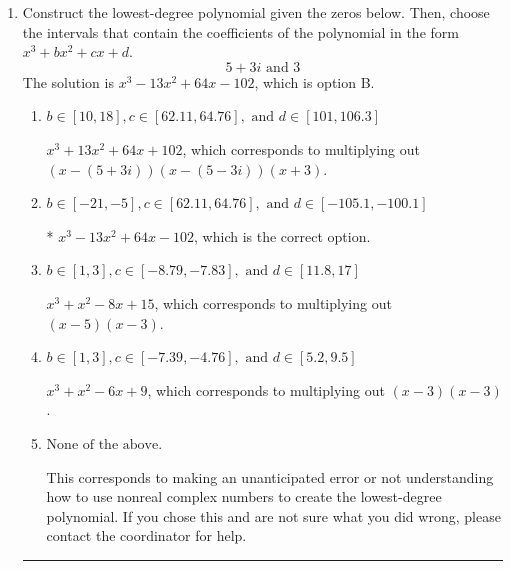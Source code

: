\documentclass{extbook}[14pt]
\newcommand{\litem}[1]{\item #1

\rule{\textwidth}{0.4pt}}
\begin{document}
\begin{enumerate}\litem{
Construct the lowest-degree polynomial given the zeros below. Then, choose the intervals that contain the coefficients of the polynomial in the form $x^3+bx^2+cx+d$.
\[ 5 + 3 i \text{ and } 3 \]The solution is \( x^{3} -13 x^{2} +64 x -102 \), which is option B.\begin{enumerate}[label=\Alph*.]
\item \( b \in [10, 18], c \in [62.11, 64.76], \text{ and } d \in [101, 106.3] \)

$x^{3} +13 x^{2} +64 x + 102$, which corresponds to multiplying out $(x-(5 + 3 i))(x-(5 - 3 i))(x + 3)$.
\item \( b \in [-21, -5], c \in [62.11, 64.76], \text{ and } d \in [-105.1, -100.1] \)

* $x^{3} -13 x^{2} +64 x -102$, which is the correct option.
\item \( b \in [1, 3], c \in [-8.79, -7.83], \text{ and } d \in [11.8, 17] \)

$x^{3} + x^{2} -8 x + 15$, which corresponds to multiplying out $(x -5)(x -3)$.
\item \( b \in [1, 3], c \in [-7.39, -4.76], \text{ and } d \in [5.2, 9.5] \)

$x^{3} + x^{2} -6 x + 9$, which corresponds to multiplying out $(x -3)(x -3)$.
\item \( \text{None of the above.} \)

This corresponds to making an unanticipated error or not understanding how to use nonreal complex numbers to create the lowest-degree polynomial. If you chose this and are not sure what you did wrong, please contact the coordinator for help.
\end{enumerate}

}
\end{enumerate}
\end{document}

